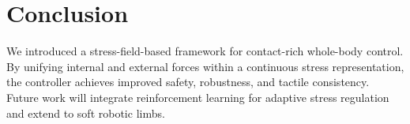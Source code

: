 \documentclass[conference]{IEEEtran}
\begin{document}
\section{Conclusion}
We introduced a stress-field-based framework for contact-rich whole-body control.
By unifying internal and external forces within a continuous stress representation, the controller achieves improved safety, robustness, and tactile consistency.
Future work will integrate reinforcement learning for adaptive stress regulation and extend to soft robotic limbs.



\end{document}
